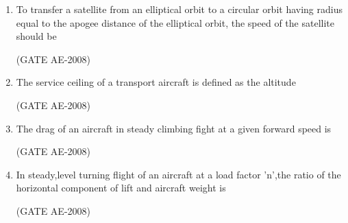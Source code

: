 \documentclass[journal,12pt,onecolumn]{IEEEtran}
\theoremstyle{remark}
\begin{document}
\begin{enumerate}
\item To transfer a satellite from an elliptical orbit to a circular orbit having radius equal to the apogee distance of the elliptical orbit, the speed of the satellite should be 
\begin{enumerate}
\end{enumerate}
\hfill(GATE AE-2008)
\quad

\item The service ceiling of a transport aircraft is defined as the altitude 
\begin{enumerate}
\end{enumerate}

\hfill(GATE AE-2008)
\quad

\item The drag of an aircraft in steady climbing fight at a given forward speed is 
\begin{enumerate}
\end{enumerate}
\hfill(GATE AE-2008)

\quad

\item In steady,level turning flight of an aircraft at a load factor 'n',the ratio of the horizontal component of lift and aircraft weight is 
\begin{enumerate}
\end{enumerate}
\hfill(GATE AE-2008)


\end{enumerate}
\end{document}

